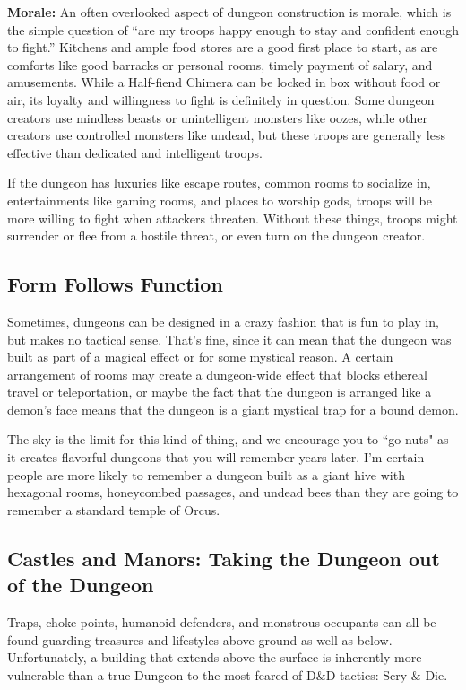 \textbf{Morale:} An often overlooked aspect of dungeon construction is morale, which is the simple question of ``are my troops happy enough to stay and confident enough to fight.'' Kitchens and ample food stores are a good first place to start, as are comforts like good barracks or personal rooms, timely payment of salary, and amusements. While a Half-fiend Chimera can be locked in box without food or air, its loyalty and willingness to fight is definitely in question. Some dungeon creators use mindless beasts or unintelligent monsters like oozes, while other creators use controlled monsters like undead, but these troops are generally less effective than dedicated and intelligent troops.

If the dungeon has luxuries like escape routes, common rooms to socialize in, entertainments like gaming rooms, and places to worship gods, troops will be more willing to fight when attackers threaten. Without these things, troops might surrender or flee from a hostile threat, or even turn on the dungeon creator.

\subsection{Form Follows Function}

Sometimes, dungeons can be designed in a crazy fashion that is fun to play in, but makes no tactical sense. That's fine, since it can mean that the dungeon was built as part of a magical effect or for some mystical reason. A certain arrangement of rooms may create a dungeon-wide effect that blocks ethereal travel or teleportation, or maybe the fact that the dungeon is arranged like a demon's face means that the dungeon is a giant mystical trap for a bound demon.

The sky is the limit for this kind of thing, and we encourage you to ``go nuts" as it creates flavorful dungeons that you will remember years later. I'm certain people are more likely to remember a dungeon built as a giant hive with hexagonal rooms, honeycombed passages, and undead bees than they are going to remember a standard temple of Orcus.

\subsection{Castles and Manors: Taking the Dungeon out of the Dungeon}

Traps, choke-points, humanoid defenders, and monstrous occupants can all be found guarding treasures and lifestyles above ground as well as below. Unfortunately, a building that extends above the surface is inherently more vulnerable than a true Dungeon to the most feared of D\&D tactics: Scry \& Die.

